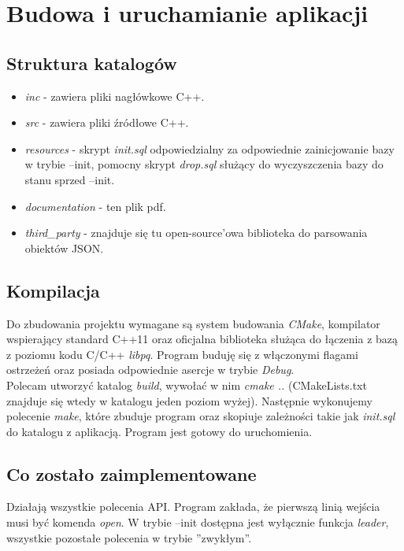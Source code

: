 \documentclass[12pt]{article}
\begin{document}
\section{Budowa i uruchamianie aplikacji}

\subsection{Struktura katalogów}
\begin{itemize}
	
	\item \textit{inc} - zawiera pliki nagłówkowe C++.
	
	\item \textit{src} - zawiera pliki źródłowe C++.
	
	\item \textit{resources} - skrypt \textit{init.sql} odpowiedzialny za odpowiednie zainicjowanie bazy w trybie --init, pomocny skrypt \textit{drop.sql} służący do wyczyszczenia bazy do stanu sprzed --init.
	
	\item \textit{documentation} - ten plik pdf.
	
	\item \textit{third\_party} - znajduje się tu open-source'owa biblioteka do parsowania obiektów JSON.
	
\end{itemize}

\subsection{Kompilacja}
Do zbudowania projektu wymagane są system budowania \textit{CMake}, kompilator wspierający standard C++11 oraz oficjalna biblioteka służąca do łączenia z bazą z poziomu kodu C/C++ \textit{libpq}. Program buduję się z włączonymi flagami ostrzeżeń oraz posiada odpowiednie asercje w trybie \textit{Debug}.\\
Polecam utworzyć katalog \textit{build}, wywołać w nim \textit{cmake ..} (CMakeLists.txt znajduje się wtedy w katalogu jeden poziom wyżej). Następnie wykonujemy polecenie \textit{make}, które zbuduje program oraz skopiuje zależności takie jak \textit{init.sql} do katalogu z aplikacją. Program jest gotowy do uruchomienia.

\subsection{Co zostało zaimplementowane}
Działają wszystkie polecenia API. Program zakłada, że pierwszą linią wejścia musi być komenda \textit{open}. W trybie --init dostępna jest wyłącznie funkcja \textit{leader}, wszystkie pozostałe polecenia w trybie ''zwykłym''.
\end{document}
